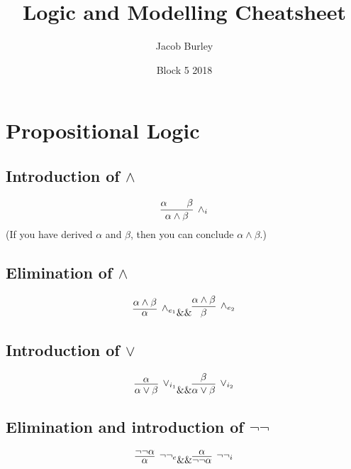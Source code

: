 \documentclass{article}
\title{Logic and Modelling Cheatsheet}
\author{Jacob Burley}
\date{Block 5 2018}
\newcommand{\rulename}[1]{#1}
\begin{document}
\maketitle

\section{Propositional Logic}

\subsection{Introduction of $\wedge$}
    \begin{equation*}
      \infer[\rulename{\wedge_i}]
      {\alpha \wedge \beta}
      {\alpha && \beta}
    \end{equation*}
    (If you have derived $\alpha$ and $\beta$, then you can conclude $\alpha \wedge \beta$.)
\subsection{Elimination of $\wedge$}
    \begin{equation*}
      \infer[\rulename{\wedge_{e_1}}]
      {\alpha}
      {\alpha \wedge \beta}
      \&\&
      \infer[\rulename{\wedge_{e_2}}]
      {\beta}
      {\alpha \wedge \beta}
    \end{equation*}

\subsection{Introduction of $\vee$}
    \begin{equation*}
      \infer[\rulename{\vee_{i_1}}]
      {\alpha \vee \beta}
      {\alpha}
      \&\&
      \infer[\rulename{\vee_{i_2}}]
      {\alpha \vee \beta}
      {\beta}
    \end{equation*}
    
\subsection{Elimination and introduction of $\neg\neg$}
    \begin{equation*}
      \infer[\rulename{\neg\neg_e}]
      {\alpha}
      {\neg\neg\alpha}
      \&\&
      \infer[\rulename{\neg\neg_i}]
      {\neg\neg\alpha}
      {\alpha}
    \end{equation*}
    
\end{document}
